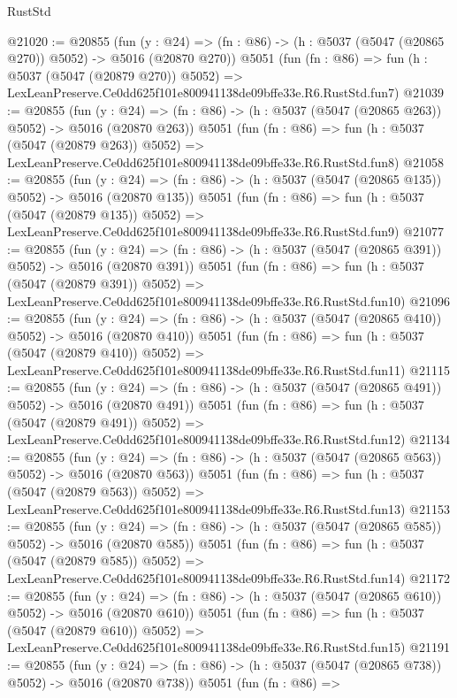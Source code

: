 \begin{lexlean}{RustStd}
\begin{coremodule}
@21020 := @20855
    (fun (y : @24) => (fn : @86) -> (h : @5037 (@5047 (@20865 @270)) @5052) -> @5016 (@20870 @270))
    @5051
    (fun (fn : @86) =>
    fun (h : @5037 (@5047 (@20879 @270)) @5052) =>
    LexLeanPreserve.Ce0dd625f101e800941138de09bffe33e.R6.RustStd.fun7)
@21039 := @20855
    (fun (y : @24) => (fn : @86) -> (h : @5037 (@5047 (@20865 @263)) @5052) -> @5016 (@20870 @263))
    @5051
    (fun (fn : @86) =>
    fun (h : @5037 (@5047 (@20879 @263)) @5052) =>
    LexLeanPreserve.Ce0dd625f101e800941138de09bffe33e.R6.RustStd.fun8)
@21058 := @20855
    (fun (y : @24) => (fn : @86) -> (h : @5037 (@5047 (@20865 @135)) @5052) -> @5016 (@20870 @135))
    @5051
    (fun (fn : @86) =>
    fun (h : @5037 (@5047 (@20879 @135)) @5052) =>
    LexLeanPreserve.Ce0dd625f101e800941138de09bffe33e.R6.RustStd.fun9)
@21077 := @20855
    (fun (y : @24) => (fn : @86) -> (h : @5037 (@5047 (@20865 @391)) @5052) -> @5016 (@20870 @391))
    @5051
    (fun (fn : @86) =>
    fun (h : @5037 (@5047 (@20879 @391)) @5052) =>
    LexLeanPreserve.Ce0dd625f101e800941138de09bffe33e.R6.RustStd.fun10)
@21096 := @20855
    (fun (y : @24) => (fn : @86) -> (h : @5037 (@5047 (@20865 @410)) @5052) -> @5016 (@20870 @410))
    @5051
    (fun (fn : @86) =>
    fun (h : @5037 (@5047 (@20879 @410)) @5052) =>
    LexLeanPreserve.Ce0dd625f101e800941138de09bffe33e.R6.RustStd.fun11)
@21115 := @20855
    (fun (y : @24) => (fn : @86) -> (h : @5037 (@5047 (@20865 @491)) @5052) -> @5016 (@20870 @491))
    @5051
    (fun (fn : @86) =>
    fun (h : @5037 (@5047 (@20879 @491)) @5052) =>
    LexLeanPreserve.Ce0dd625f101e800941138de09bffe33e.R6.RustStd.fun12)
@21134 := @20855
    (fun (y : @24) => (fn : @86) -> (h : @5037 (@5047 (@20865 @563)) @5052) -> @5016 (@20870 @563))
    @5051
    (fun (fn : @86) =>
    fun (h : @5037 (@5047 (@20879 @563)) @5052) =>
    LexLeanPreserve.Ce0dd625f101e800941138de09bffe33e.R6.RustStd.fun13)
@21153 := @20855
    (fun (y : @24) => (fn : @86) -> (h : @5037 (@5047 (@20865 @585)) @5052) -> @5016 (@20870 @585))
    @5051
    (fun (fn : @86) =>
    fun (h : @5037 (@5047 (@20879 @585)) @5052) =>
    LexLeanPreserve.Ce0dd625f101e800941138de09bffe33e.R6.RustStd.fun14)
@21172 := @20855
    (fun (y : @24) => (fn : @86) -> (h : @5037 (@5047 (@20865 @610)) @5052) -> @5016 (@20870 @610))
    @5051
    (fun (fn : @86) =>
    fun (h : @5037 (@5047 (@20879 @610)) @5052) =>
    LexLeanPreserve.Ce0dd625f101e800941138de09bffe33e.R6.RustStd.fun15)
@21191 := @20855
    (fun (y : @24) => (fn : @86) -> (h : @5037 (@5047 (@20865 @738)) @5052) -> @5016 (@20870 @738))
    @5051
    (fun (fn : @86) =>

\end{coremodule}
\end{lexlean}
